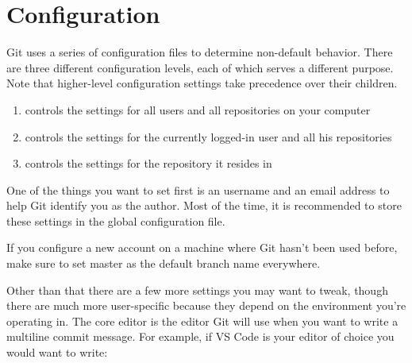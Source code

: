 \section{Configuration}\label{configuation}

\begin{flushleft}
	Git uses a series of configuration files to determine non-default behavior. There
	are three different configuration levels, each of which serves a different purpose.
	Note that higher-level configuration settings take precedence over their children.
\end{flushleft}

\begin{enumerate}
	\item {} controls the settings for all users and all repositories on your computer
	\item {} controls the settings for the currently logged-in user and all his repositories
	\item {} controls the settings for the repository it resides in
\end{enumerate}

\begin{flushleft}
	One of the things you want to set first is an username and an email address
	to help Git identify you as the author. Most of the time, it is recommended
	to store these settings in the global configuration file.
\end{flushleft}

\begin{flushleft}
\end{flushleft}
\vspace{-0.6cm}
\begin{flushleft}
\end{flushleft}

\begin{flushleft}
	If you configure a new account on a machine where Git hasn't been used before,
	make sure to set master as the default branch name everywhere.
\end{flushleft}

\begin{flushleft}
\end{flushleft}

\begin{flushleft}
	Other than that there are a few more settings you may want to tweak, though there
	are much more user-specific because they depend on the environment you're operating
	in. The core editor is the editor Git will use when you want to write a multiline
	commit message. For example, if VS Code is your editor of choice you would want to write:
\end{flushleft}

